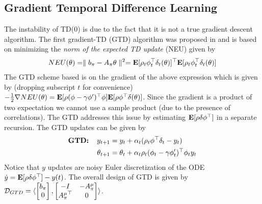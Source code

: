 \subsection{Gradient Temporal Difference Learning}
The instability of TD($0$) is due to the fact that it is not a true gradient descent algorithm. The first gradient-TD (GTD) algorithm was proposed in \cite{} and is based on minimizing the \emph{norm of the expected TD update} (NEU) given by
\begin{align}\label{neu}
NEU(\theta)=\parallel b_\pi -A_\pi\theta\parallel^2
=\mathbf{E}[\rho_t\phi_t^\top\delta_t(\theta)]^\top\mathbf{E}[\rho_t\phi_t^\top\delta_t(\theta)]
\end{align}
The GTD scheme based is on the gradient of the above expression which is given by (dropping subscript $t$ for convenience) $-\frac{1}{2}\nabla NEU(\theta)=\mathbf{E}[\rho (\phi-\gamma\phi')^\top \phi]\mathbf{E}[\rho \phi^\top\delta(\theta)]$. Since the gradient is a product of two expectation we cannot use a sample product (due to the presence of correlations). The GTD addresses this issue by estimating $\mathbf{E}[\rho\delta\phi^\top]$ in a separate recursion. The GTD updates can be given by
\begin{align}
\begin{split}
\textbf{GTD:\quad}y_{t+1}&=y_t+\alpha_t(\rho_t\phi^\top\delta_t -y_t)\\
\theta_{t+1}&=\theta_t+\alpha_t\rho_t(\phi_t-\gamma\phi'_t)^\top\phi_ty_t
\end{split}
\end{align}
Notice that $y$ updates are noisy Euler discretization of the ODE $\dot{y}=\mathbf{E}[\rho\delta\phi^\top]-y(t)$. The overall design of GTD is given by $\mathcal{D}_{GTD}=\langle \begin{bmatrix}b_\pi\\ 0\\ \end{bmatrix},\begin{bmatrix}-I &-A^\mu_\pi \\ {A^\mu_\pi}^\top &0 \\ \end{bmatrix}\rangle$.\par
